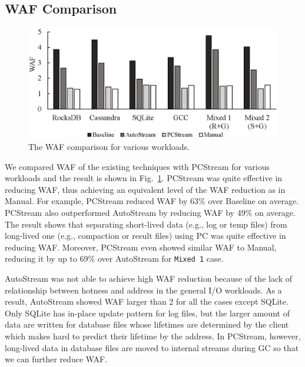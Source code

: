 \subsection{WAF Comparison}

\begin{figure}[t]
	\centering
	\includegraphics[width=0.9\linewidth]{figure/waf}
	\caption{The WAF comparison for various workloads.}
	\label{fig:waf}
\end{figure}


We compared WAF of the existing techniques with \textsf{\small PCStream} for 
various workloads and the result is shown in Fig.~\ref{fig:waf}.  
\textsf{\small PCStream} was quite effective in reducing WAF, 
thus achieving an equivalent level of the WAF reduction as in \textsf{\small Manual}.  
For example, \textsf{\small PCStream}  
reduced WAF by 63\% over \textsf{\small Baseline} on average.
\textsf{\small PCStream} also outperformed \textsf{\small AutoStream} 
by reducing WAF by 49\% on average.
The result shows that separating short-lived data (e.g., log or temp files) 
from long-lived one (e.g., compaction or result files) 
using PC was quite effective in reducing WAF.  
Moreover, \textsf{\small PCStream} even showed similar WAF to \textsf{\small Manual}, 
reducing it by up to 69\% over \textsf{\small AutoStream} for \texttt{Mixed 1} case.

AutoStream was not able to achieve high WAF reduction because of 
the lack of relationship between hotness and address in the general I/O workloads.
As a result, AutoStream showed WAF larger than 2 for all the cases except SQLite.
Only SQLite has in-place update pattern for log files, but the larger amount of data are
written for database files whose lifetimes are determined by the client
which makes hard to predict their lifetime by the address.
In PCStream, however, long-lived data in database files are moved to internal streams
during GC so that we can further reduce WAF.


